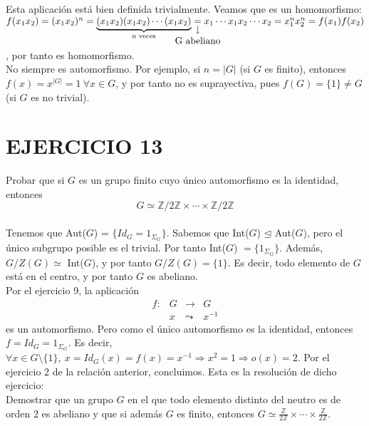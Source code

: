 \documentclass{article}
\newcommand{\nota}[3][2ex]{
    \underset{\mathclap{
        \begin{tikzpicture}
          \draw[<-] (0, 0) to ++(0,#1);
          \node[below] at (0,0) {#3};
        \end{tikzpicture}}}{#2}
}
\begin{document}
Esta aplicación está bien definida trivialmente. Veamos que es un homomorfismo: $ f(x_1x_2) = (x_1x_2)^n = \underbrace{(x_1x_2)(x_1x_2) \cdots (x_1x_2)}_{\text{n veces}} \nota{=}{\text{G abeliano}} x_1 \cdots x_1x_2 \cdots x_2 = x_1^nx_2^n = f(x_1)f(x_2)$, por tanto es homomorfismo.\\
No siempre es automorfismo. Por ejemplo, si $n = |G|$ (si $G$ es finito), entonces $f(x) = x^{|G|} = 1 \ \forall x \in G$, y por tanto no es suprayectiva, pues $f(G) = \{1\} \neq G$ (si $G$ es no trivial).\\

\section*{EJERCICIO 13}

Probar que si $G$ es un grupo finito cuyo único automorfismo es la identidad, entonces
$$
G \simeq \mathbb{Z}/2\mathbb{Z} \times \cdots \times \mathbb{Z}/2\mathbb{Z}
$$\\

Tenemos que Aut($G$) = $\{Id_G = 1_{\Sigma_G}\}$. Sabemos que Int($G$) $\unlhd $ Aut($G$), pero el único subgrupo posible es el trivial. Por tanto Int($G$) $ = \{1_{\Sigma_G}\}$. Además, $G/Z(G) \simeq$ Int($G$), y por tanto $G/Z(G) = \{1\}$. Es decir, todo elemento de $G$ está en el centro, y por tanto $G$ es abeliano.\\
Por el ejercicio 9, la aplicación $$
\begin{array}{cccc}
  f: & G & \longrightarrow & G \\
     & x & \leadsto & x^{-1}
\end{array}  
$$ 
es un automorfismo. Pero como el único automorfismo es la identidad, entonces $f = Id_G = 1_{\Sigma_G}$. Es decir, $\forall x \in G \setminus \{1\}, \ x = Id_G(x) = f(x) = x^{-1} \Longrightarrow x^2 = 1 \Longrightarrow o(x) = 2$. Por el ejercicio 2 de la relación anterior, concluimos. Esta es la resolución de dicho ejercicio:\\

Demostrar que un grupo $G$ en el que todo elemento distinto del neutro es de orden $2$ es abeliano y que si además $G$ es finito, entonces $G \simeq \frac{\mathbb{Z}}{2\mathbb{Z}} \times \cdots \times \frac{\mathbb{Z}}{2\mathbb{Z}}$.\\
\end{document}
